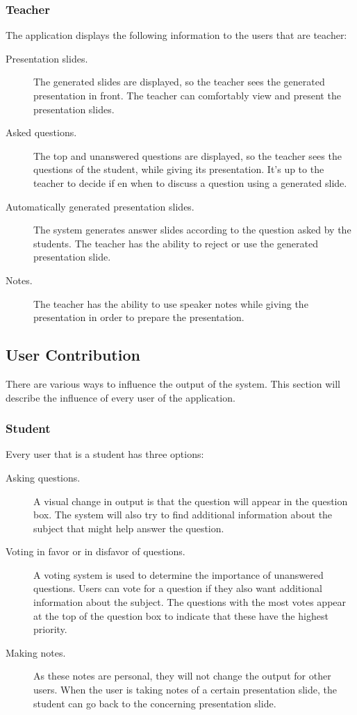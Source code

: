 \documentclass[11pt]{article}
\begin{document}
\subsubsection{Teacher}
The application displays the following information to the users that are teacher:
\begin{description}
\item[Presentation slides.] The generated slides are displayed, so the teacher sees the generated presentation in front. The teacher can comfortably view and present the presentation slides.
\item[Asked questions.] The top and unanswered questions are displayed, so the teacher sees the questions of the student, while giving its presentation. It's up to the teacher to decide if en when to discuss a question using a generated slide. 
\item[Automatically generated presentation slides.] The system generates answer slides according to the question asked by the students. The teacher has the ability to reject or use the generated presentation slide.
\item[Notes.] The teacher has the ability to use speaker notes while giving the presentation in order to prepare the presentation.
\end{description}

\subsection{User Contribution}
There are various ways to influence the output of the system. This section will describe the influence of every user of the application.
\subsubsection{Student}
Every user that is a student has three options:
\begin{description}
\item[Asking questions.] A visual change in output is that the question will appear in the question box. The system will also try to find additional information about the subject that might help answer the question.
\item[Voting in favor or in disfavor of questions.] A voting system is used to determine the importance of unanswered questions. Users can vote for a question if they also want additional information about the subject. The questions with the most votes appear at the top of the question box to indicate that these have the highest priority.
\item[Making notes.] As these notes are personal, they will not change the output for other users. When the user is taking notes of a certain presentation slide, the student can go back to the concerning presentation slide.
\end{description}
\end{document}
